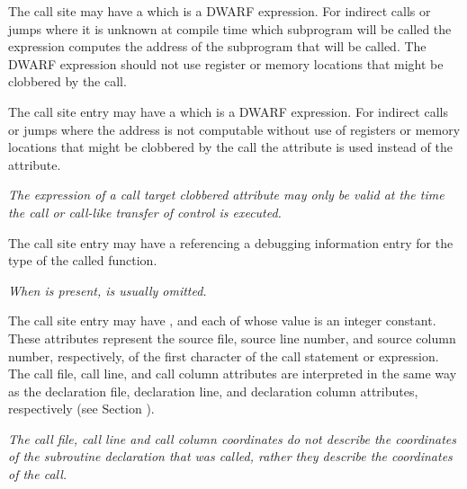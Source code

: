 The call site may have a 
\DWATcalltargetDEFN{}
 which is
a DWARF expression.  For indirect calls or jumps where it is unknown at
compile time which subprogram will be called the expression computes the
address of the subprogram that will be called.  The DWARF expression should
not use register or memory locations that might be clobbered by the call.

The call site entry may have a 
\DWATcalltargetclobberedDEFN{}
which is a DWARF expression.  For indirect calls or jumps where the
address is not computable without use of registers or memory locations that
might be clobbered by the call the \DWATcalltargetclobberedNAME{}
attribute is used instead of the \DWATcalltarget{} attribute.

\textit{The expression of a call target clobbered attribute may only be 
valid at the time the call or call-like transfer of control is executed.}

The call site entry may have a \DWATtypeDEFN{}
referencing a debugging information entry for the type of the called function.  

\textit{When \DWATcallorigin{} is present, \DWATtypeNAME{} is usually omitted.}

The call site entry may have 
\DWATcallfileDEFN{}, 
\DWATcalllineDEFN{} and 
\DWATcallcolumnDEFN{} 
each of whose value is an integer constant.
These attributes represent the source file, source line number, and source
column number, respectively, of the first character of the call statement or
expression.  The call file, call line, and call column attributes are
interpreted in the same way as the declaration file, declaration
line, and declaration column attributes, respectively 
(see Section ).

\textit{The call file, call line and call column coordinates do 
not describe the coordinates of the subroutine declaration that 
was called, rather they describe the coordinates of the call.}

